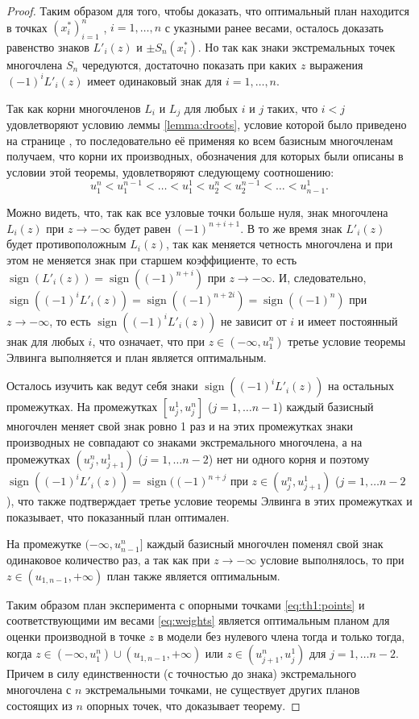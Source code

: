 \documentclass[specialist,
               substylefile = spbu.rtx,
               subf,href,colorlinks=true, 12pt]{disser}
\theoremstyle{definition}
\DeclareMathOperator*{\sign}{sign}
\begin{document}
\begin{proof}
	Таким образом для того, чтобы доказать, что оптимальный план находится в точках $(x_i^*)_{i=1}^n$ , $i = 1, \ldots, n$ с указными ранее весами, осталось доказать равенство знаков $L'_i(z)$ и $\pm S_n(x_i^*)$. Но так как знаки экстремальных точек многочлена $S_n$ чередуются, достаточно показать при каких $z$ выражения $(-1)^i L'_i(z)$ имеет одинаковый знак для $i=1,\ldots , n$.
	
	Так как корни многочленов $L_i$ и $L_j$ для любых $i$ и $j$ таких, что $i < j$ удовлетворяют условию леммы \ref{lemma:droots}, условие которой было приведено на странице \pageref{lemma:droots}, то последовательно её применяя ко всем базисным многочленам получаем, что корни их производных, обозначения для которых были описаны в условии этой теоремы, удовлетворяют следующему соотношению:
	\begin{equation*}
		u^n_1 < u^{n-1}_1 < \ldots < u^1_1 < u^n_2 < u^{n-1}_2 < \ldots < u_{n-1}^1.
	\end{equation*}
	
	Можно видеть, что, так как все узловые точки больше нуля, знак многочлена $L_i(z)$ при $z \to -\infty$ будет равен $(-1)^{n+i+1}$. В то же время знак $L'_i(z)$ будет противоположным $L_i(z)$, так как меняется четность многочлена и при этом не меняется знак при старшем коэффициенте, то есть $\sign(L'_i(z)) = \sign((-1)^{n+i})$ при $z \to -\infty$. И, следовательно, $\sign((-1)^i L'_i(z)) = \sign((-1)^{n+2i}) = \sign((-1)^{n})$ при $z \to -\infty$, то есть $\sign((-1)^i L'_i(z))$ не зависит от $i$ и имеет постоянный знак для любых $i$, что означает, что при $z \in (-\infty, u_1^n)$ третье условие теоремы Элвинга выполняется и план является оптимальным.
	
	Осталось изучить как ведут себя знаки $\sign((-1)^i L'_i(z))$ на остальных промежутках. На промежутках $[u_j^1, u_j^n]$ ($j = 1, \ldots {n-1}$) каждый базисный многочлен меняет свой знак ровно 1 раз и на этих промежутках знаки производных не совпадают со знаками экстремального многочлена, а на промежутках $(u_j^n, u_{j+1}^1)$ ($j=1, \ldots n-2$) нет ни одного корня и поэтому $\sign((-1)^i L'_i(z)) = \sign ((-1)^{n + j}$ при $z \in (u_j^n, u_{j+1}^1)$ ($j=1, \ldots n-2$), что также подтверждает третье условие теоремы Элвинга в этих промежутках и показывает, что показанный план оптимален.
	
	На промежутке $(-\infty, u_{n-1}^n]$ каждый базисный многочлен поменял свой знак одинаковое количество раз, а так как при $z \to -\infty$ условие выполнялось, то при $z \in (u_{1, n-1}, +\infty)$ план также является оптимальным.
	
	Таким образом план эксперимента с опорными точками \eqref{eq:th1:points} и соответствующими им весами \eqref{eq:weights} является оптимальным планом для оценки производной в точке $z$ в модели без нулевого члена тогда и только тогда, когда $z \in  (-\infty, u_1^n) \cup (u_{1, n-1}, +\infty)$ или $z \in (u_{j+1}^n, u_{j}^1)$ для $j=1, \ldots n-2$. Причем в силу единственности (с точностью до знака) экстремального многочлена с $n$ экстремальными точками, не существует других планов состоящих из $n$ опорных точек, что доказывает теорему.

	\end{proof}
	
\end{document}
